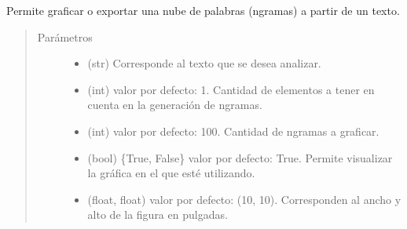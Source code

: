 \documentclass[letterpaper,10pt,openany,spanish]{sphinxmanual}
\begin{document}
\begin{fulllineitems}
\label{\detokenize{funciones/exploracion:exploracion.nube_palabras}}
Permite graficar o exportar una nube de palabras (n\sphinxhyphen{}gramas) a partir de un texto.
\begin{quote}\begin{description}
\item[{Parámetros}] \leavevmode\begin{itemize}
\item {} 
 \textendash{} (str) Corresponde al texto que se desea analizar.

\item {} 
 \textendash{} (int) valor por defecto: 1. Cantidad de elementos a tener en cuenta en la generación de n\sphinxhyphen{}gramas.

\item {} 
 \textendash{} (int) valor por defecto: 100. Cantidad de n\sphinxhyphen{}gramas a graficar.

\item {} 
 \textendash{} (bool) \{True, False\} valor por defecto: True. Permite visualizar la gráfica en el  que esté utilizando.

\item {} 
 \textendash{} (float, float) valor por defecto: (10, 10). Corresponden al ancho y alto de la figura en pulgadas.


\end{itemize}
\end{description}
\end{quote}
\end{fulllineitems}
\end{document}
